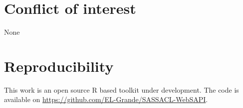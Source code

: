 \documentclass[a4paper, 10pt, conference]{ieeeconf}      %
\begin{document}
\section*{Conflict of interest}
None

\section*{Reproducibility}
This  work is an open source   R based toolkit under development.  The code is available on \url{https://github.com/EL-Grande/SASSACL-WebSAPI}. %
\newpage



\clearpage
\end{document}
